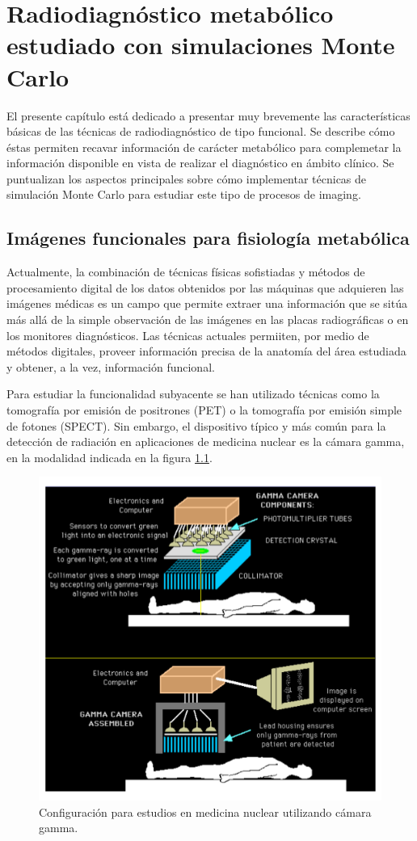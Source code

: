 \chapter{Radiodiagn\'ostico metab\'olico estudiado con simulaciones Monte Carlo}

El presente capítulo está dedicado a presentar muy brevemente las características básicas de las técnicas de radiodiagnóstico de tipo funcional. Se describe cómo éstas permiten recavar información de carácter metabólico para complemetar la información disponible en vista de realizar el diagnóstico en ámbito clínico. Se puntualizan los aspectos principales sobre cómo implementar técnicas de simulación Monte Carlo para estudiar este tipo de procesos de imaging.

\section{Im\'agenes funcionales para fisiolog\'ia metab\'olica}

Actualmente, la combinación de técnicas físicas sofistiadas y métodos de procesamiento digital de los datos obtenidos por las máquinas que adquieren las imágenes médicas es un campo que permite extraer una información que se sitúa más allá de la simple observación de las imágenes en las placas radiográficas o en los monitores diagnósticos. Las técnicas actuales permiiten, por medio de métodos digitales, proveer información precisa de la anatomía del área estudiada y obtener, a la vez, información funcional.

Para estudiar la funcionalidad subyacente se han utilizado técnicas como la tomografía por emisión de positrones (PET) o la tomografía por emisión simple de fotones (SPECT). Sin embargo, el dispositivo típico y más común para la detección de radiación en aplicaciones de medicina nuclear es la cámara gamma, en la modalidad indicada en la figura \ref{camgam}.

\begin{figure}
 \centering
 \includegraphics[width = .75\textwidth]{figures/cap9/camgam.png}
 \caption{Configuración para estudios en medicina nuclear utilizando cámara gamma.}
 \label{camgam}
\end{figure}

